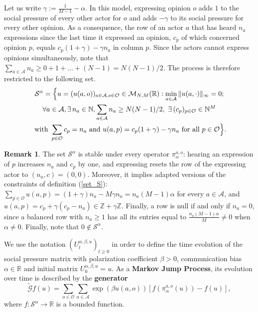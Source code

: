 \documentclass[11pt]{article}
\theoremstyle{definition}
\newtheorem{remark}{Remark}
\newcommand{\st}{\mathcal{S}}
\newcommand{\A}{\mathcal{A}}
\newcommand{\opn}{\mathcal{O}}
\def\R{{\mathbb R}}
\begin{document}
Let us write $\gamma:=\frac{1}{M-1}-\alpha$. In this model, expressing opinion $o$ adds $1$ to the social pressure of every other actor for $o$ and adds $-\gamma$ to its social pressure for every other opinion. As a consequence, the row of an actor $a$ that has heard $n_a$ expressions since the last time it expressed an opinion, $c_p$ of which concerned opinion $p$, equals $c_p(1+\gamma)-\gamma n_a$ in column $p$. Since the actors cannot express opinions simultaneously, note that $\sum_{a\in \A}n_a \geq 0+1+\ldots +(N-1)=N(N-1)/2$. The process is therefore restricted to the following set.
\begin{multline} \label{biased_set_S}
\st^{\alpha}= \Bigl\{u= (u(a,o))_{a\in\mathcal{A}, o\in\mathcal{O}} \in \mathcal{M}_{N,M}(\mathbb{R}):\min_{a\in\mathcal{A}}\|u(a,\cdot)\|_{\infty}=0; \\ 
\forall a\in\mathcal{A}, \exists\, n_a\in\mathbb{N}, \sum_{a\in \A}n_a \geq N(N-1)/2, \ \exists\,(c_p)_{p\in\opn}\in\mathbb{N}^M \\
\text{ with } \sum_{p\in\opn}c_p=n_a\text{ and } u(a,p)=c_p(1+\gamma)-\gamma n_a \text{ for all } p \in \opn \Bigr\}.
\end{multline}
 
\begin{remark}\label{rem:Salphaproperties}
The set $\st^{\alpha}$ is stable under every operator $\pi^{a,o}_{\alpha}$: hearing an expression of $p$ increases $n_a$ and $c_p$ by one, and expressing resets the row of the expressing actor to $(n_a,c)=(0,0)$. Moreover, it implies adapted versions of the constraints of definition (\ref{set_S}): $\sum_{p\in\opn}u(a,p)=(1+\gamma)n_a-M\gamma n_a=n_a(M-1)\alpha$ for every $a\in\A$, and $u(a,p)=c_p+\gamma(c_p-n_a)\in\mathbb{Z}+\gamma\mathbb{Z}$. Finally, a row is null if and only if $n_a=0$, since a balanced row with $n_a\geq 1$ has all its entries equal to $\frac{n_a(M-1)\alpha}{M}\neq 0$ when $\alpha\neq 0$. Finally, note that $0\not \in \st^{\alpha}$.
\end{remark}


We use the notation $(U_t^{\alpha,\beta,u})_{t\geq0}$ in order to define the time evolution of the social pressure matrix with polarization coefficient $\beta>0$, communication bias $\alpha \in \R$ and initial matrix $U_0^{\alpha, \beta,u}=u$. As a \textbf{Markov Jump Process}, its evolution over time is described by the \textbf{generator}
\begin{equation}\label{biasGenerator}
    \tilde{\mathcal{G}}f(u)=\sum_{o\in\mathcal{O}}\sum_{a\in\mathcal{A}}\exp(\beta u(a,o))[f(\pi_\alpha^{a,o}(u))-f(u)],
\end{equation}
where $f:\st^{\alpha} \to \R$ is a bounded function.
\end{document}

